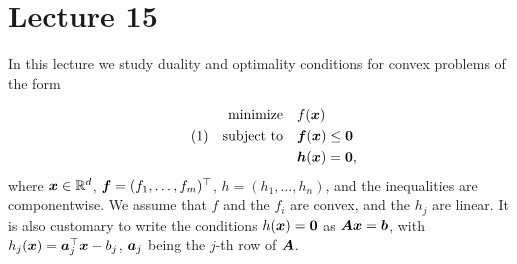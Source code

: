 %
%
% 


\chapter*{Lecture 15}
\addtocounter{chapter}{15}
\addtocounter{section}{0}


In this lecture we study duality and optimality conditions for convex problems of the form

\begin{align*}\label{eq:constr}\tag{1}
\begin{split}
 \text{minimize}\quad & f(\bm{x})\\
 \quad\text{subject to}\quad & \bm{f}(\bm{x})\leq \bm{0}\\
         & \bm{h}(\bm{x})= \bm{0},
\end{split}
\end{align*}
where $\bm{x}\in \mathbb{R}^d$, $\bm{f}=(f_1,\dots,f_m)^{\top}$, $h=(h_1,\dots,h_n)$, and the inequalities are componentwise. We assume that $f$ and the $f_i$ are convex, and the $h_j$ are linear. It is also customary to write the conditions $h(\bm{x})=\bm{0}$ as $\bm{A}\bm{x}=\bm{b}$, with $h_j(\bm{x}) = \bm{a}_j^{\top}\bm{x}-b_j$, $\bm{a}_j$ being the $j$-th row of $\bm{A}$.

